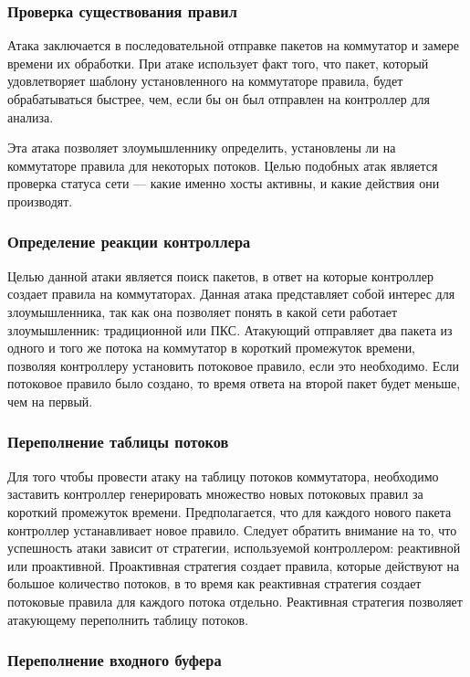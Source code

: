\documentclass[../thesis.tex]{subfiles}
\begin{document}
\subsubsection{Проверка существования правил}

Атака заключается в последовательной отправке пакетов на коммутатор и замере времени их обработки.
При атаке использует факт того, что пакет, который удовлетворяет шаблону установленного на коммутаторе правила, будет обрабатываться быстрее, чем, если бы он был отправлен на контроллер для анализа.

Эта атака позволяет злоумышленнику определить, установлены ли на коммутаторе правила для некоторых потоков.
Целью подобных атак является проверка статуса сети --- какие именно хосты активны, и какие действия они производят.

\subsubsection{Определение реакции контроллера}

Целью данной атаки является поиск пакетов, в ответ на которые контроллер создает правила на коммутаторах.
Данная атака представляет собой интерес для злоумышленника, так как она позволяет понять в какой сети работает злоумышленник: традиционной или ПКС.
Атакующий отправляет два пакета из одного и того же потока на коммутатор в короткий промежуток времени, позволяя контроллеру установить потоковое правило, если это необходимо.
Если потоковое правило было создано, то время ответа на второй пакет будет меньше, чем на первый.

\subsubsection{Переполнение таблицы потоков}

Для того чтобы провести атаку на таблицу потоков коммутатора, необходимо заставить контроллер генерировать множество новых потоковых правил за короткий промежуток времени.
Предполагается, что для каждого нового пакета контроллер устанавливает новое правило.
Следует обратить внимание на то, что успешность атаки зависит от стратегии, используемой контроллером: реактивной или проактивной.
Проактивная стратегия создает правила, которые действуют на большое количество потоков, в то время как реактивная стратегия создает потоковые правила для каждого потока отдельно.
Реактивная стратегия позволяет атакующему переполнить таблицу потоков.

\subsubsection{Переполнение входного буфера}
\end{document}
